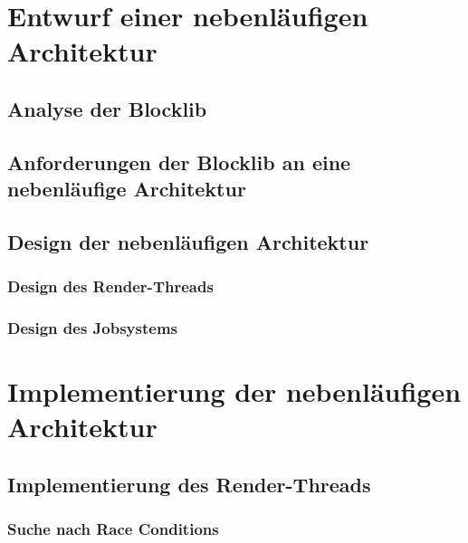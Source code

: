 \documentclass[12pt,a4paper,listof=toc,parskip=half,numbers=noenddot,abstract=true]{scrartcl}
\begin{document}
\clearpage
\section{Entwurf einer nebenläufigen Architektur}\label{kap:entwurf}


\subsection{Analyse der Blocklib}\label{sec:blocklibAnalyse}


\subsection{Anforderungen der Blocklib an eine nebenläufige Architektur}\label{sec:anforderungen}


\subsection{Design der nebenläufigen Architektur}

\subsubsection{Design des Render-Threads}\label{sec:desgignRender-Thread}

\subsubsection{Design des Jobsystems}\label{sec:designJobsystem}


\clearpage
\section{Implementierung der nebenläufigen Architektur}\label{kap:Implementierung}

\subsection{Implementierung des Render-Threads}


\subsubsection{Suche nach Race Conditions}\label{sec:searchRace}

\end{document}

